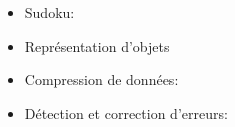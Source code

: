 {{\section*{\BrochureWebsitesAndKeywords}
{\raggedright
\begin{itemize}
  \item Sudoku: \href{https://fr.wikipedia.org/wiki/Sudoku}{}
  \item Représentation d’objets
  \item Compression de données: \href{https://fr.wikipedia.org/wiki/Compression_de_donn\%C3\%A9es}{}
  \item Détection et correction d’erreurs: \href{https://fr.wikipedia.org/wiki/Code_correcteur}{}
\end{itemize}


}

}{}

\def\AuthorHromkovicJ{} %
\def\AuthorLacherR{} %
\def\AuthorMunozX{} %
\def\AuthorBarcelonaM{} %
\def\AuthorDatzkoS{} %
\def\AuthorGrubbT{} %
\def\AuthorPelletE{} %

\newpage}{}
